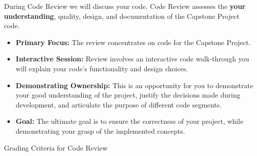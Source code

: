 \begin{frame}[t]{During Code Review we will discuss your code.}
Code Review assesses the \textbf{your understanding}, quality, design, and documentation of the Capstone Project code.
\vspace{1em}

\begin{itemize}
\small
    \item \textbf{Primary Focus:} The review concentrates on code for the Capstone Project. 
    \item \textbf{Interactive Session:} Review involves an interactive code walk-through you will explain your code's functionality and design choices.
    \item \textbf{Demonstrating Ownership:} This is an opportunity for you to demonstrate your good understanding of the project, justify the decisions made during development, and articulate the purpose of different code segments.
    \item \textbf{Goal:} The ultimate goal is to ensure the correctness of your project, while demonstrating your grasp of the implemented concepts.
\end{itemize}
\end{frame}

\begin{frame}[t]{Grading Criteria for Code Review}
\end{frame}

